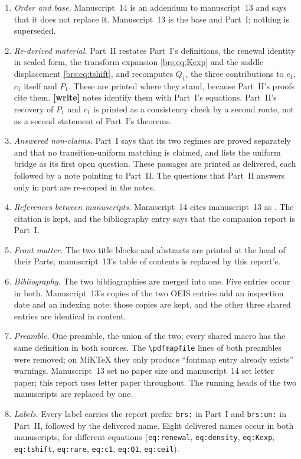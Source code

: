\documentclass[11pt]{article}
\numberwithin{equation}{section}
\theoremstyle{remark}\newtheorem{remark}[theorem]{Remark}
\begin{document}
\begin{enumerate}
\item \emph{Order and base.} Manuscript~14 is an addendum to manuscript~13 and says that it does not replace it. Manuscript~13 is the base and Part~I; nothing is superseded.
\item \emph{Re-derived material.} Part~II restates Part~I's definitions, the renewal identity in scaled form, the transform expansion \eqref{brs:eq:Kexp} and the saddle displacement \eqref{brs:eq:tshift}, and recomputes $Q_1$, the three contributions to $c_1$, $c_1$ itself and $P_1$. These are printed where they stand, because Part~II's proofs cite them. \textbf{[write]} notes identify them with Part~I's equations. Part~II's recovery of $P_1$ and $c_1$ is printed as a consistency check by a second route, not as a second statement of Part~I's theorems.
\item \emph{Answered non-claims.} Part~I says that its two regimes are proved separately and that no transition-uniform matching is claimed, and lists the uniform bridge as its first open question. These passages are printed as delivered, each followed by a note pointing to Part~II. The questions that Part~II answers only in part are re-scoped in the notes.
\item \emph{References between manuscripts.} Manuscript~14 cites manuscript~13 as \cite{base}. The citation is kept, and the bibliography entry says that the companion report is Part~I.
\item \emph{Front matter.} The two title blocks and abstracts are printed at the head of their Parts; manuscript~13's table of contents is replaced by this report's.
\item \emph{Bibliography.} The two bibliographies are merged into one. Five entries occur in both. Manuscript~13's copies of the two OEIS entries add an inspection date and an indexing note; those copies are kept, and the other three shared entries are identical in content.
\item \emph{Preamble.} One preamble, the union of the two; every shared macro has the same definition in both sources. The \verb|\pdfmapfile| lines of both preambles were removed; on MiKTeX they only produce ``fontmap entry already exists'' warnings. Manuscript~13 set no paper size and manuscript~14 set letter paper; this report uses letter paper throughout. The running heads of the two manuscripts are replaced by one.
\item \emph{Labels.} Every label carries the report prefix: \texttt{brs:} in Part~I and \texttt{brs:un:} in Part~II, followed by the delivered name. Eight delivered names occur in both manuscripts, for different equations (\texttt{eq:renewal}, \texttt{eq:density}, \texttt{eq:Kexp}, \texttt{eq:tshift}, \texttt{eq:rare}, \texttt{eq:c1}, \texttt{eq:Q1}, \texttt{eq:ceil}).
\end{enumerate}
\end{document}
